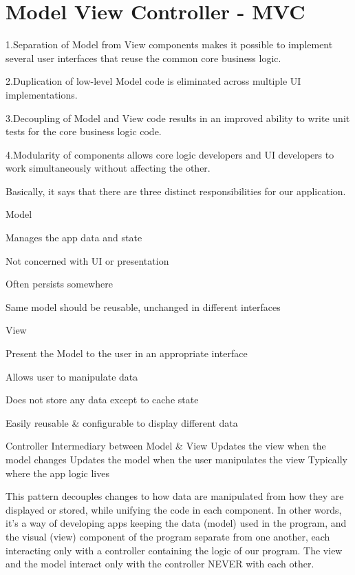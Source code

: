 \documentclass{book}
\begin{document}
\chapter{Model View Controller - MVC}

1.Separation of Model from View components makes it possible to implement several user interfaces that reuse the common core business logic.

2.Duplication of low-level Model code is eliminated across multiple UI implementations.

3.Decoupling of Model and View code results in an improved ability to write unit tests for the core business logic code.

4.Modularity of components allows core logic developers and UI developers to work simultaneously without affecting the other.

Basically, it says that there are three distinct responsibilities for our application. 

    Model

        Manages the app data and state

        Not concerned with UI or presentation

        Often persists somewhere

        Same model should be reusable, unchanged in different interfaces

    View

        Present the Model to the user in an appropriate interface

        Allows user to manipulate data

        Does not store any data except to cache state

        Easily reusable \& configurable to display different data

    Controller
        Intermediary between Model \& View
        Updates the view when the model changes
        Updates the model when the user manipulates the view
        Typically where the app logic lives

This pattern decouples changes to how data are manipulated from how they are displayed or stored, while unifying the code in each component. 
In other words, it's a way of developing apps keeping the data (model) used in the program, and the visual (view) component of the program separate from one another,
each interacting only with a controller containing the logic of our program. 
The view and the model interact only with the controller NEVER with each other.
\end{document}
